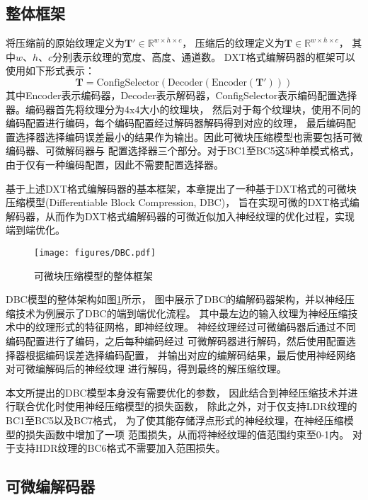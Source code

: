 \subsection{整体框架}

将压缩前的原始纹理定义为$\mathbf{T}'\in \mathbb{R}^{w\times h\times c}$，
压缩后的纹理定义为$\mathbf{T}\in \mathbb{R}^{w\times h\times c}$，
其中$w$、$h$、$c$分别表示纹理的宽度、高度、通道数。
DXT格式编解码器的框架可以使用如下形式表示：
\begin{equation}
    \mathbf{T}=\text{ConfigSelector}(\text{Decoder}(\text{Encoder}(\mathbf{T}')))
\end{equation}
其中Encoder表示编码器，Decoder表示解码器，ConfigSelector表示编码配置选择器。编码器首先将纹理分为4x4大小的纹理块，
然后对于每个纹理块，使用不同的编码配置进行编码，每个编码配置经过解码器解码得到对应的纹理，
最后编码配置选择器选择编码误差最小的结果作为输出。因此可微块压缩模型也需要包括可微编码器、可微解码器与
配置选择器三个部分。对于BC1至BC5这5种单模式格式，由于仅有一种编码配置，因此不需要配置选择器。

基于上述DXT格式编解码器的基本框架，本章提出了一种基于DXT格式的可微块压缩模型(Differentiable Block Compression, DBC)， 
旨在实现可微的DXT格式编解码器，从而作为DXT格式编解码器的可微近似加入神经纹理的优化过程，实现端到端优化。

\begin{figure}[htbp]
    \centering
    \texttt{[image: figures/DBC.pdf]}
    \caption{可微块压缩模型的整体框架}
    \label{fig:DBC_overview}
\end{figure}

DBC模型的整体架构如图\ref{fig:DBC_overview}所示，
图中展示了DBC的编解码器架构，并以神经压缩技术为例展示了DBC的端到端优化流程。
其中最左边的输入纹理为神经压缩技术中的纹理形式的特征网格，即神经纹理。
神经纹理经过可微编码器后通过不同编码配置进行了编码，之后每种编码经过
可微解码器进行解码，然后使用配置选择器根据编码误差选择编码配置，
并输出对应的编解码结果，最后使用神经网络对可微编解码后的神经纹理
进行解码，得到最终的解压缩纹理。

本文所提出的DBC模型本身没有需要优化的参数，
因此结合到神经压缩技术并进行联合优化时使用神经压缩模型的损失函数，
除此之外，对于仅支持LDR纹理的BC1至BC5以及BC7格式，
为了使其能存储浮点形式的神经纹理，在神经压缩模型的损失函数中增加了一项
范围损失，从而将神经纹理的值范围约束至0-1内。
对于支持HDR纹理的BC6格式不需要加入范围损失。


\subsection{可微编解码器}

